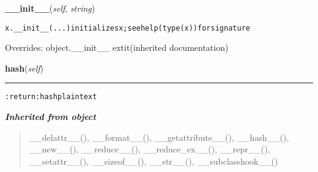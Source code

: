     \vspace{0.5ex}

\hspace{.8\funcindent}\begin{boxedminipage}{\funcwidth}

    \raggedright \textbf{\_\_init\_\_}(\textit{self}, \textit{string})

\setlength{\parskip}{2ex}
\begin{alltt}
x.\_\_init\_\_(...) initializes x; see help(type(x)) for signature
\end{alltt}

\setlength{\parskip}{1ex}
      Overrides: object.\_\_init\_\_ 	extit{(inherited documentation)}

    \end{boxedminipage}

    \label{hal:maths:crypt:MD5:hash}

    \vspace{0.5ex}

\hspace{.8\funcindent}\begin{boxedminipage}{\funcwidth}

    \raggedright \textbf{hash}(\textit{self})

    \vspace{-1.5ex}

    \rule{\textwidth}{0.5\fboxrule}
\setlength{\parskip}{2ex}
\begin{alltt}

:return: hash plaintext
\end{alltt}

\setlength{\parskip}{1ex}
    \end{boxedminipage}


\large{\textbf{\textit{Inherited from object}}}

\begin{quote}
\_\_delattr\_\_(), \_\_format\_\_(), \_\_getattribute\_\_(), \_\_hash\_\_(), \_\_new\_\_(), \_\_reduce\_\_(), \_\_reduce\_ex\_\_(), \_\_repr\_\_(), \_\_setattr\_\_(), \_\_sizeof\_\_(), \_\_str\_\_(), \_\_subclasshook\_\_()
\end{quote}


